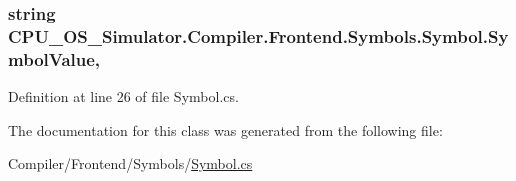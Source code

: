 \subsubsection[{Symbol\+Value}]{\setlength{\rightskip}{0pt plus 5cm}string C\+P\+U\+\_\+\+O\+S\+\_\+\+Simulator.\+Compiler.\+Frontend.\+Symbols.\+Symbol.\+Symbol\+Value\hspace{0.3cm}{\ttfamily [get]}, {\ttfamily [set]}}\label{class_c_p_u___o_s___simulator_1_1_compiler_1_1_frontend_1_1_symbols_1_1_symbol_a2b91f23039d826f890bf806bd43b10cb}


Definition at line 26 of file Symbol.\+cs.



The documentation for this class was generated from the following file\+:\begin{DoxyCompactItemize}
\item 
Compiler/\+Frontend/\+Symbols/\hyperlink{_symbol_8cs}{Symbol.\+cs}\end{DoxyCompactItemize}
